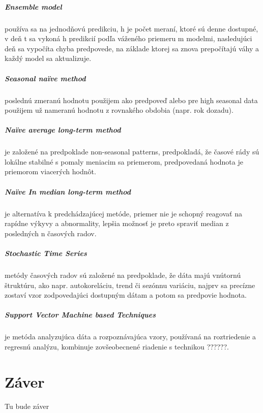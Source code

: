 \documentclass[12pt,oneside,slovak,a4paper]{book}
\begin{document}
\paragraph{Ensemble model}
používa sa na jednodňovú predikciu, h je počet meraní, ktoré sú denne dostupné,
v deň t sa vykoná h predikcií podľa váženého priemeru m modelmi, nasledujúci
deň sa vypočíta chyba predpovede, na základe ktorej sa znova prepočítajú váhy
a každý model sa aktualizuje\cite{Grmanova2016}.

\paragraph{Seasonal naïve method}
poslednú zmeranú hodnotu použijem ako predpoveď alebo pre high seasonal data
použijem už nameranú hodnotu z rovnakého obdobia (napr. rok
dozadu)\cite{Grmanova2016}.

\paragraph{Naïve average long-term method}
je založené na predpoklade non-seasonal patterns, predpokladá, že časové rády sú
lokálne stabilné s pomaly meniacim sa priemerom, predpovedaná hodnota je
priemorom viacerých hodnôt\cite{Grmanova2016}.

\paragraph{Naïve In median long-term method}
je alternatíva k predchádzajúcej metóde, priemer nie je schopný reagovať na
rapídne výkyvy a abnormality, lepšia možnosť je preto spraviť median
z posledných n časových radov\cite{Grmanova2016}.

\paragraph{Stochastic Time Series}
metódy časových radov sú založené na predpoklade, že dáta majú vnútornú
štruktúru, ako napr. autokoreláciu, trend či sezónnu variáciu, najprv sa
precízne zostaví vzor zodpovedajúci dostupným dátam a potom sa predpovie
hodnota\cite{KumarSingh2013}.

\paragraph{Support Vector Machine based Techniques}
je metóda analyzujúca dáta a rozpoznávajúca vzory, používaná na roztriedenie
a regresnú analýzu, kombinuje zovšeobecnené riadenie
s technikou ??????\cite{KumarSingh2013}.


\chapter{Záver} \label{zaver}
Tu bude záver




\end{document}
